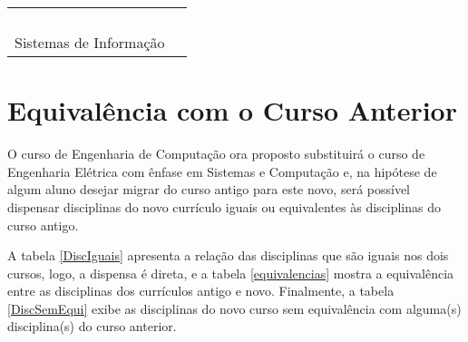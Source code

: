 \begin{table}[ht]
\begin{tabularx}{\textwidth}{ X  l }
		                                                        & \ICII              \\ %
		                                                        & \LogProg          \\ %
																& \MineraDados      \\ %
		                                                        & \ProcImag         \\ %
		                                                        \hline													
		\multirow{4}{*}{Sistemas de Informação}                 & \EngSistC         \\ %
																& \EngSistA		 \\  %
		                                                        & \ProjBD           \\
		                                                        & \EngCompSoc       \\
		                                                        \hline
	\end{tabularx}
\end{table}




\section{Equivalência com o Curso Anterior}
O curso de Engenharia de Computação ora proposto substituirá o curso de Engenharia Elétrica com ênfase em Sistemas e Computação e, na hipótese de algum aluno desejar migrar do curso antigo para este novo, será possível dispensar disciplinas do novo currículo iguais ou equivalentes às disciplinas do curso antigo.

A tabela \ref{DiscIguais} apresenta a relação das disciplinas que são iguais nos dois cursos, logo, a dispensa é direta, e a tabela \ref{equivalencias} mostra a equivalência entre as disciplinas dos currículos antigo e novo. Finalmente, a tabela \ref{DiscSemEqui} exibe as disciplinas do novo curso sem equivalência com alguma(s) disciplina(s) do curso anterior.

